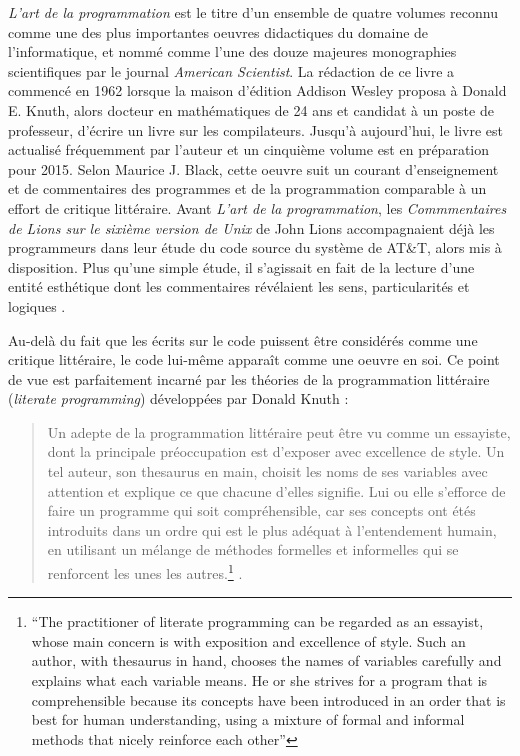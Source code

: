 \emph{L'art de la programmation} est le titre d'un ensemble de quatre volumes reconnu comme une des plus importantes oeuvres didactiques du domaine de l'informatique, et nommé comme l'une des douze majeures monographies scientifiques par le journal \emph{American Scientist}. La rédaction de ce livre a commencé en 1962 lorsque la maison d'édition Addison Wesley proposa à Donald E. Knuth, alors docteur en mathématiques de 24 ans et candidat à un poste de professeur, d'écrire un livre sur les compilateurs. Jusqu'à aujourd'hui, le livre est actualisé fréquemment par l'auteur et un cinquième volume est en préparation pour 2015. Selon Maurice J. Black, cette oeuvre suit un courant d'enseignement et de commentaires des programmes et de la programmation comparable à un effort de critique littéraire. Avant \emph{L'art de la programmation}, les \emph{Commmentaires de Lions sur le sixième version de Unix} de John Lions accompagnaient déjà les programmeurs dans leur étude du code source du système de AT\&T, alors mis à disposition. Plus qu'une simple étude, il s'agissait en fait de la lecture d'une entité esthétique dont les commentaires révélaient les sens, particularités et logiques \citep{Black2002}.

Au-delà du fait que les écrits sur le code puissent être considérés comme une critique littéraire, le code lui-même apparaît comme une oeuvre en soi. Ce point de vue est parfaitement incarné par les théories de la programmation littéraire (\emph{literate programming}) développées par Donald Knuth :

\begin{quote}
Un adepte de la programmation littéraire peut être vu comme un essayiste, dont la principale préoccupation est d'exposer avec excellence de style. Un tel auteur, son thesaurus en main, choisit les noms de ses variables avec attention et explique ce que chacune d'elles signifie. Lui ou elle s'efforce de faire un programme qui soit compréhensible, car ses concepts ont étés introduits dans un ordre qui est le plus adéquat à l'entendement humain, en utilisant un mélange de méthodes formelles et informelles qui se renforcent les unes les autres.\footnote{“The practitioner of literate programming can be regarded as an essayist, whose main concern is with exposition and excellence of style. Such an author, with thesaurus in hand, chooses the names of variables carefully and explains what each variable means. He or she strives for a program that is comprehensible because its concepts have been introduced in an order that is best for human understanding, using a mixture of formal and informal methods that nicely reinforce each other”} \citep[p.1]{Knuth1983}.
\end{quote}

